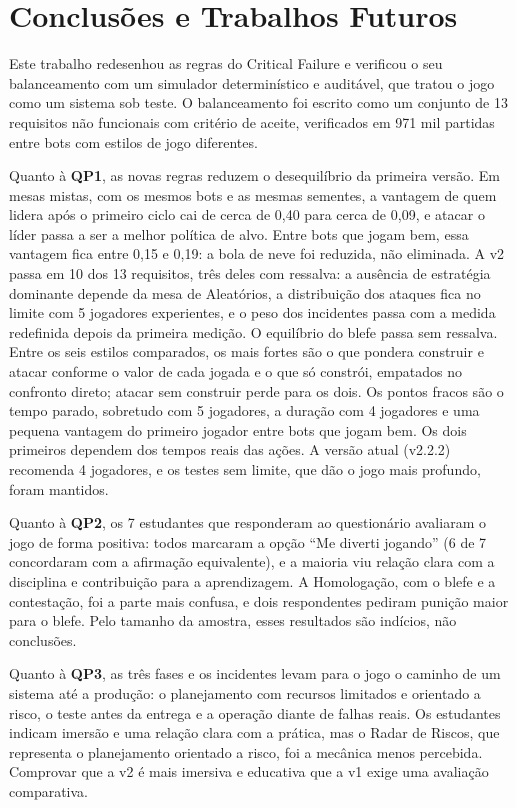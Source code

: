 \section{Conclusões e Trabalhos Futuros}
\label{sec:conclusoes}

Este trabalho redesenhou as regras do Critical Failure e verificou o seu balanceamento com um simulador
determinístico e auditável, que tratou o jogo como um sistema sob teste. O balanceamento foi escrito
como um conjunto de 13
requisitos não funcionais com critério de aceite, verificados em 971 mil partidas entre bots com estilos de jogo
diferentes.

Quanto à \textbf{QP1}, as novas regras reduzem o desequilíbrio da primeira versão. Em mesas mistas, com
os mesmos bots e as mesmas sementes, a vantagem de quem lidera após o primeiro ciclo cai de cerca de 0,40 para
cerca de 0,09, e atacar o líder passa a ser a melhor política de alvo. Entre bots que jogam bem, essa
vantagem fica entre 0,15 e 0,19: a bola de neve foi reduzida, não eliminada. A v2 passa em 10 dos 13
requisitos, três deles com ressalva: a ausência de estratégia dominante depende da mesa de Aleatórios, a
distribuição dos ataques fica no limite com 5 jogadores experientes, e o peso dos incidentes passa com a medida
redefinida depois da primeira medição. O equilíbrio do blefe passa sem ressalva. Entre os seis estilos
comparados, os mais fortes são o que pondera construir e atacar conforme o valor de cada jogada e o que só
constrói, empatados no confronto direto; atacar sem construir perde para os dois. Os pontos fracos são o tempo
parado, sobretudo com 5 jogadores, a duração com 4 jogadores e uma
pequena vantagem do primeiro jogador entre bots que jogam bem. Os dois primeiros dependem dos tempos reais das
ações. A versão atual (v2.2.2) recomenda 4 jogadores, e os testes sem limite, que dão o jogo mais profundo, foram
mantidos.

Quanto à \textbf{QP2}, os 7 estudantes que responderam ao questionário avaliaram o jogo de forma positiva: todos
marcaram a opção ``Me diverti jogando'' (6 de 7 concordaram com a afirmação equivalente), e a maioria
viu relação clara com a disciplina e contribuição para a aprendizagem. A Homologação, com o blefe e a
contestação, foi a parte mais confusa, e dois respondentes pediram punição maior para o blefe. Pelo
tamanho da amostra, esses resultados são indícios, não conclusões.

Quanto à \textbf{QP3}, as três fases e os incidentes levam para o jogo o caminho de um sistema até a produção: o
planejamento com recursos limitados e orientado a risco, o teste antes da entrega e a operação diante de falhas
reais. Os estudantes indicam imersão e uma relação clara com a prática, mas o Radar de Riscos, que representa o
planejamento orientado a risco, foi a mecânica menos percebida. Comprovar que a v2 é mais imersiva e educativa que
a v1 exige uma avaliação comparativa.

